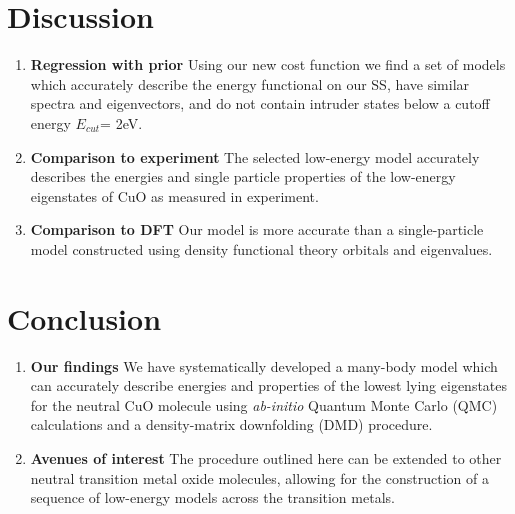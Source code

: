 \documentclass{article}
\begin{document}
\section{Discussion}
\begin{enumerate}
\item \textbf{Regression with prior} Using our new cost function we find a set of models which accurately describe the energy functional on our SS, have similar spectra and eigenvectors, and do not contain  intruder states below a cutoff energy $E_{cut} $= 2eV.

\item \textbf{Comparison to experiment} The selected low-energy model accurately describes the energies and single particle properties of the low-energy eigenstates of CuO as measured in experiment.

\item \textbf{Comparison to DFT} Our model is more accurate than a single-particle model constructed using density functional theory orbitals and eigenvalues.
\end{enumerate}

\section{Conclusion}
\begin{enumerate}
\item \textbf{Our findings} We have systematically developed a many-body model which can accurately describe energies and properties of the lowest lying eigenstates for the neutral CuO molecule using \textit{ab-initio} Quantum Monte Carlo (QMC) calculations and a density-matrix downfolding (DMD) procedure. 

\item \textbf{Avenues of interest} The procedure outlined here can be extended to other neutral transition metal oxide molecules, allowing for the construction of a sequence of low-energy models across the transition metals.
\end{enumerate}

\pagebreak
\end{document}
